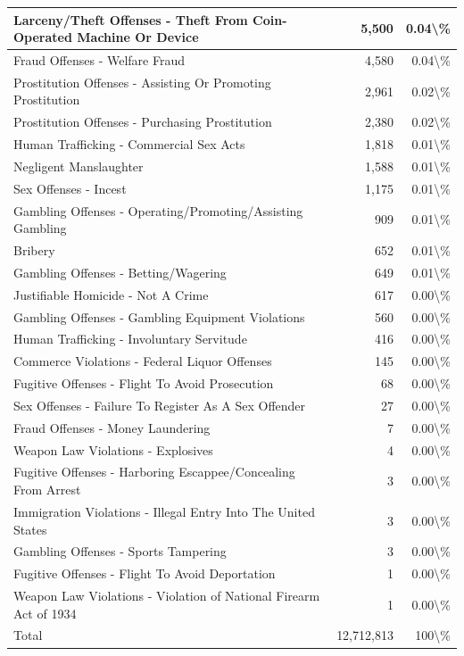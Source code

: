 \documentclass[
]{krantz}
\begin{document}
\begin{longtable}[t]{l|r|r}
Larceny/Theft Offenses - Theft From Coin-Operated Machine Or Device & 5,500 & 0.04\textbackslash{}\%\\
\hline
Fraud Offenses - Welfare Fraud & 4,580 & 0.04\textbackslash{}\%\\
\hline
Prostitution Offenses - Assisting Or Promoting Prostitution & 2,961 & 0.02\textbackslash{}\%\\
\hline
Prostitution Offenses - Purchasing Prostitution & 2,380 & 0.02\textbackslash{}\%\\
\hline
Human Trafficking - Commercial Sex Acts & 1,818 & 0.01\textbackslash{}\%\\
\hline
Negligent Manslaughter & 1,588 & 0.01\textbackslash{}\%\\
\hline
Sex Offenses - Incest & 1,175 & 0.01\textbackslash{}\%\\
\hline
Gambling Offenses - Operating/Promoting/Assisting Gambling & 909 & 0.01\textbackslash{}\%\\
\hline
Bribery & 652 & 0.01\textbackslash{}\%\\
\hline
Gambling Offenses - Betting/Wagering & 649 & 0.01\textbackslash{}\%\\
\hline
Justifiable Homicide - Not A Crime & 617 & 0.00\textbackslash{}\%\\
\hline
Gambling Offenses - Gambling Equipment Violations & 560 & 0.00\textbackslash{}\%\\
\hline
Human Trafficking - Involuntary Servitude & 416 & 0.00\textbackslash{}\%\\
\hline
Commerce Violations - Federal Liquor Offenses & 145 & 0.00\textbackslash{}\%\\
\hline
Fugitive Offenses - Flight To Avoid Prosecution & 68 & 0.00\textbackslash{}\%\\
\hline
Sex Offenses - Failure To Register As A Sex Offender & 27 & 0.00\textbackslash{}\%\\
\hline
Fraud Offenses - Money Laundering & 7 & 0.00\textbackslash{}\%\\
\hline
Weapon Law Violations - Explosives & 4 & 0.00\textbackslash{}\%\\
\hline
Fugitive Offenses - Harboring Escappee/Concealing From Arrest & 3 & 0.00\textbackslash{}\%\\
\hline
Immigration Violations - Illegal Entry Into The United States & 3 & 0.00\textbackslash{}\%\\
\hline
Gambling Offenses - Sports Tampering & 3 & 0.00\textbackslash{}\%\\
\hline
Fugitive Offenses - Flight To Avoid Deportation & 1 & 0.00\textbackslash{}\%\\
\hline
Weapon Law Violations - Violation of National Firearm Act of 1934 & 1 & 0.00\textbackslash{}\%\\
\hline
Total & 12,712,813 & 100\textbackslash{}\%\\
\hline
\end{longtable}
\end{document}
